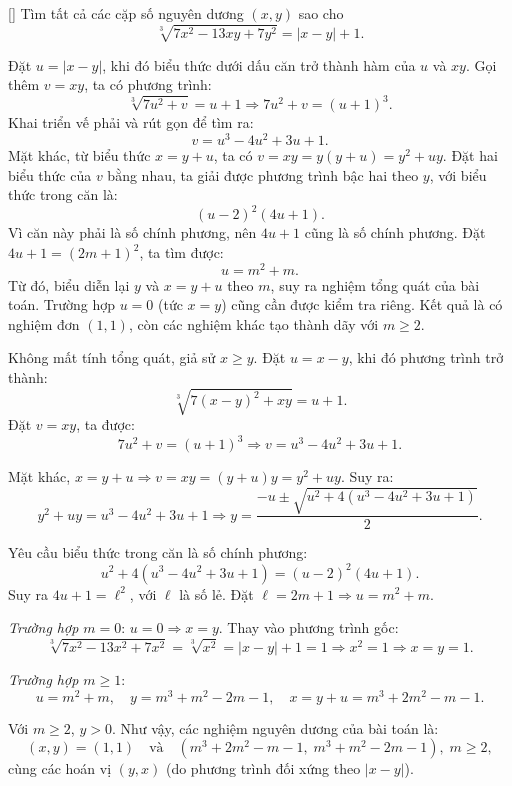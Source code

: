 \documentclass[../04-diophantine-equations.tex]{subfiles}
\begin{document}
\begin{example*}\label{example:GER-2015-TST-P4}[\textbf{}]
	Tìm tất cả các cặp số nguyên dương \((x, y)\) sao cho
	\[
		\sqrt[3]{7x^2 - 13xy + 7y^2} = |x - y| + 1.
	\]
\end{example*}

\begin{story*}
    Đặt \( u = |x - y| \), khi đó biểu thức dưới dấu căn trở thành hàm của \( u \) và \( xy \).  
    Gọi thêm \( v = xy \), ta có phương trình:
    \[
        \sqrt[3]{7u^2 + v} = u + 1 \Rightarrow 7u^2 + v = (u + 1)^3.
    \]
    Khai triển vế phải và rút gọn để tìm ra:
    \[
        v = u^3 - 4u^2 + 3u + 1.
    \]
    Mặt khác, từ biểu thức \( x = y + u \), ta có \( v = x y = y(y + u) = y^2 + uy \).  
    Đặt hai biểu thức của \( v \) bằng nhau, ta giải được phương trình bậc hai theo \( y \), với biểu thức trong căn là:
    \[
        (u - 2)^2(4u + 1).
    \]
    Vì căn này phải là số chính phương, nên \( 4u + 1 \) cũng là số chính phương. Đặt \( 4u + 1 = (2m + 1)^2 \), ta tìm được:
    \[
        u = m^2 + m.
    \]
    Từ đó, biểu diễn lại \( y \) và \( x = y + u \) theo \( m \), suy ra nghiệm tổng quát của bài toán.  
    Trường hợp \( u = 0 \) (tức \( x = y \)) cũng cần được kiểm tra riêng. Kết quả là có nghiệm đơn \( (1,1) \), còn các nghiệm khác tạo thành dãy với \( m \ge 2 \).
\end{story*}

\bigbreak

\begin{soln}\footnotemark
	Không mất tính tổng quát, giả sử \( x \ge y \). Đặt \( u = x - y \), khi đó phương trình trở thành:
	\[
		\sqrt[3]{7(x - y)^2 + xy} = u + 1.
	\]
	Đặt \( v = xy \), ta được:
	\[
		7u^2 + v = (u + 1)^3 \Rightarrow v = u^3 - 4u^2 + 3u + 1.
	\]
	
	Mặt khác, \( x = y + u \Rightarrow v = x y = (y + u)y = y^2 + uy \). Suy ra:
	\[
		y^2 + uy = u^3 - 4u^2 + 3u + 1 
		\Rightarrow y = \frac{-u \pm \sqrt{u^2 + 4(u^3 - 4u^2 + 3u + 1)}}{2}.
	\]
	
	Yêu cầu biểu thức trong căn là số chính phương:
	\[
		u^2 + 4(u^3 - 4u^2 + 3u + 1) = (u - 2)^2 (4u + 1).
	\]
	Suy ra \( 4u + 1 = \ell^2 \), với \( \ell \) là số lẻ. Đặt \( \ell = 2m + 1 \Rightarrow u = m^2 + m \).

	\textit{Trường hợp \( m = 0 \)}: \( u = 0 \Rightarrow x = y \). Thay vào phương trình gốc:
	\[
		\sqrt[3]{7x^2 - 13x^2 + 7x^2} = \sqrt[3]{x^2} = |x - y| + 1 = 1 \Rightarrow x^2 = 1 \Rightarrow x = y = 1.
	\]
	
	\textit{Trường hợp \( m \ge 1 \)}:  
	\[
		u = m^2 + m, \quad y = m^3 + m^2 - 2m - 1, \quad x = y + u = m^3 + 2m^2 - m - 1.
	\]
	
	Với \( m \ge 2 \), \( y > 0 \). Như vậy, các nghiệm nguyên dương của bài toán là:
	\[
		(x, y) = (1, 1) \quad \text{và} \quad \left(m^3 + 2m^2 - m - 1,\; m^3 + m^2 - 2m - 1\right),\; m \ge 2,
	\]
	cùng các hoán vị \((y,x)\) (do phương trình đối xứng theo \( |x - y| \)).
\end{soln}

\end{document}
